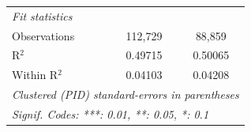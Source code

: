 \begin{tabular}{lcc}
   \midrule
   \emph{Fit statistics}\\
   Observations                                                & 112,729       & 88,859\\  
   R$^2$                                                       & 0.49715       & 0.50065\\  
   Within R$^2$                                                & 0.04103       & 0.04208\\  
   \midrule \midrule
   \multicolumn{3}{l}{\emph{Clustered (PID) standard-errors in parentheses}}\\
   \multicolumn{3}{l}{\emph{Signif. Codes: ***: 0.01, **: 0.05, *: 0.1}}\\
\end{tabular}
\par\endgroup
